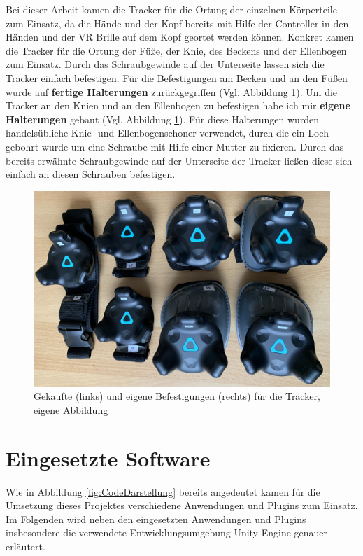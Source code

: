 \newline
Bei dieser Arbeit kamen die Tracker für die Ortung der einzelnen Körperteile zum Einsatz, da die Hände und der Kopf bereits mit Hilfe der Controller in den Händen und der VR Brille auf dem Kopf geortet werden können. Konkret kamen die Tracker für die Ortung der Füße, der Knie, des Beckens und der Ellenbogen zum Einsatz. Durch das Schraubgewinde auf der Unterseite lassen sich die Tracker einfach befestigen. Für die Befestigungen am Becken und an den Füßen wurde auf \textbf{fertige Halterungen} zurückgegriffen (Vgl. Abbildung \ref{fig:Mounts}). Um die Tracker an den Knien und an den Ellenbogen zu befestigen habe ich mir \textbf{eigene Halterungen} gebaut (Vgl. Abbildung \ref{fig:Mounts}). Für diese Halterungen wurden handelsübliche Knie- und Ellenbogenschoner verwendet, durch die ein Loch gebohrt wurde um eine Schraube mit Hilfe einer Mutter zu fixieren. Durch das bereits erwähnte Schraubgewinde auf der Unterseite der Tracker ließen diese sich einfach an diesen Schrauben befestigen.
\begin{figure}[h]
	\centering
	\includegraphics[width=0.7\linewidth]{Bilder/A32_Mounts}
	\caption{Gekaufte (links) und eigene Befestigungen (rechts) für die Tracker, eigene Abbildung}
	\label{fig:Mounts}
\end{figure}

\section{Eingesetzte Software}\label{sec:Software}
Wie in Abbildung \ref{fig:CodeDarstellung} bereits angedeutet kamen für die Umsetzung dieses Projektes verschiedene Anwendungen und Plugins zum Einsatz. Im Folgenden wird neben den eingesetzten Anwendungen und Plugins insbesondere die verwendete Entwicklungsumgebung Unity Engine genauer erläutert.

